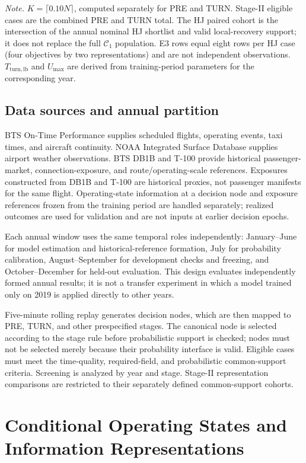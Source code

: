 \documentclass[10pt,a4paper]{article}
\numberwithin{equation}{section}
\begin{document}
\normalsize
\noindent\textit{Note.} $K=\lceil 0.10N\rceil$, computed separately for PRE and TURN. Stage-II eligible cases are the combined PRE and TURN total. The HJ paired cohort is the intersection of the annual nominal HJ shortlist and valid local-recovery support; it does not replace the full $\mathcal C_1$ population. E3 rows equal eight rows per HJ case (four objectives by two representations) and are not independent observations. $T_{\mathrm{turn,lb}}$ and $U_{\max}$ are derived from training-period parameters for the corresponding year.

\subsection{Data sources and annual partition}
BTS On-Time Performance supplies scheduled flights, operating events, taxi times, and aircraft continuity. NOAA Integrated Surface Database supplies airport weather observations. BTS DB1B and T-100 provide historical passenger-market, connection-exposure, and route/operating-scale references. Exposures constructed from DB1B and T-100 are historical proxies, not passenger manifests for the same flight. Operating-state information at a decision node and exposure references frozen from the training period are handled separately; realized outcomes are used for validation and are not inputs at earlier decision epochs.

Each annual window uses the same temporal roles independently: January--June for model estimation and historical-reference formation, July for probability calibration, August--September for development checks and freezing, and October--December for held-out evaluation. This design evaluates independently formed annual results; it is not a transfer experiment in which a model trained only on 2019 is applied directly to other years.

Five-minute rolling replay generates decision nodes, which are then mapped to PRE, TURN, and other prespecified stages. The canonical node is selected according to the stage rule before probabilistic support is checked; nodes must not be selected merely because their probability interface is valid. Eligible cases must meet the time-quality, required-field, and probabilistic common-support criteria. Screening is analyzed by year and stage. Stage-II representation comparisons are restricted to their separately defined common-support cohorts.

\section{Conditional Operating States and Information Representations}
\label{sup:representations}
\end{document}
